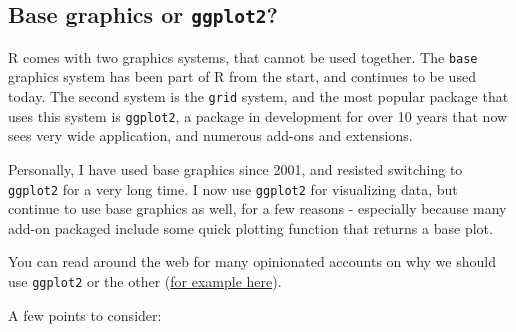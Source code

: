 \documentclass[]{book}
\begin{document}
\hypertarget{base-graphics-or-ggplot2}{%
\subsection{\texorpdfstring{Base graphics or \texttt{ggplot2}?}{Base graphics or ggplot2?}}\label{base-graphics-or-ggplot2}}

R comes with two graphics systems, that cannot be used together. The \texttt{base} graphics system has been part of R from the start, and continues to be used today. The second system is the \texttt{grid} system, and the most popular package that uses this system is \texttt{ggplot2}, a package in development for over 10 years that now sees very wide application, and numerous add-ons and extensions.

Personally, I have used base graphics since 2001, and resisted switching to \texttt{ggplot2} for a very long time. I now use \texttt{ggplot2} for visualizing data, but continue to use base graphics as well, for a few reasons - especially because many add-on packaged include some quick plotting function that returns a base plot.

You can read around the web for many opinionated accounts on why we should use \texttt{ggplot2} or the other (\href{http://varianceexplained.org/r/why-I-use-ggplot2/}{for example here}).

A few points to consider:
\end{document}

